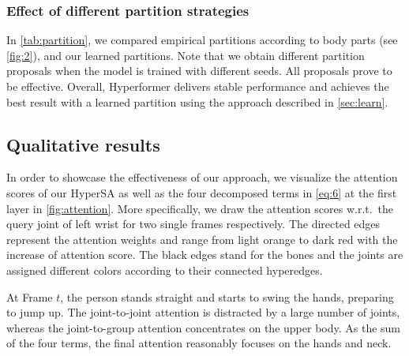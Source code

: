 \documentclass[10pt,twocolumn,letterpaper]{article}
\begin{document}
\subsubsection{Effect of different partition strategies}
\begin{table}[h]
  \centering
  \caption{The effect of different partition strategies}
  \label{tab:partition}
    \end{table}
In \cref{tab:partition}, we compared empirical partitions according to body parts (see \cref{fig:2}), and our learned partitions. Note that we obtain different partition proposals when the model is trained with different seeds. All proposals prove to be effective.
Overall, Hyperformer delivers stable performance and achieves the best result with a learned partition using the approach described in \cref{sec:learn}.

\subsection{Qualitative results}
In order to showcase the effectiveness of our approach, we visualize the attention scores of our HyperSA as well as the four decomposed terms in \cref{eq:6} at the first layer in \cref{fig:attention}. More specifically, we draw the attention scores  w.r.t.~the query joint of left wrist for two single frames respectively. The directed edges represent the attention weights and range from light orange to dark red with the increase of attention score. The black edges stand for the bones and the joints are assigned different colors according to their connected hyperedges.  

At Frame $t$, the person stands straight and starts to swing the hands, preparing to jump up. 
The joint-to-joint attention is distracted by a large number of joints, whereas the joint-to-group attention concentrates on the upper body. As the sum of the four terms, the final attention reasonably focuses on the hands and neck.
\end{document}
